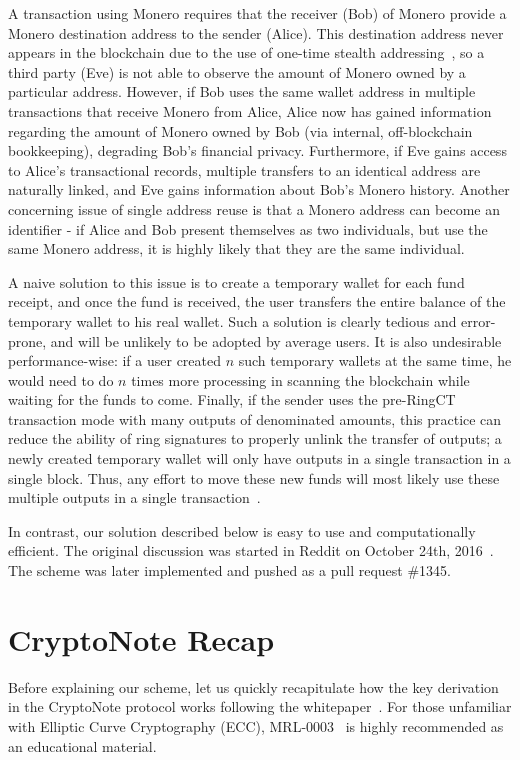 \documentclass[12pt,english]{mrl}
\theoremstyle{definition}
\numberwithin{equation}{section}
\numberwithin{figure}{section}
\numberwithin{equation}{section}
\numberwithin{equation}{section}
\numberwithin{figure}{section}
\begin{document}
A transaction using Monero requires that the receiver (Bob) of Monero provide a Monero destination address to the sender (Alice). This destination address never appears in the blockchain due to the use of one-time stealth addressing~\cite{CN}, so a third party (Eve) is not able to observe the amount of Monero owned by a particular address. However, if Bob uses the same wallet address in multiple transactions that receive Monero from Alice, Alice now has gained information regarding the amount of Monero owned by Bob (via internal, off-blockchain bookkeeping), degrading Bob's financial privacy. Furthermore, if Eve gains access to Alice's transactional records, multiple transfers to an identical address are naturally linked, and Eve gains information about Bob's Monero history. Another concerning issue of single address reuse is that a Monero address can become an identifier - if Alice and Bob present themselves as two individuals, but use the same Monero address, it is highly likely that they are the same individual. 

A naive solution to this issue is to create a temporary wallet for each fund receipt, and once the fund is received, the user transfers the entire balance of the temporary wallet to his real wallet. Such a solution is clearly tedious and error-prone, and will be unlikely to be adopted by average users. It is also undesirable performance-wise: if a user created $n$ such temporary wallets at the same time, he would need to do $n$ times more processing in scanning the blockchain while waiting for the funds to come. Finally, if the sender uses the pre-RingCT transaction mode with many outputs of denominated amounts, this practice can reduce the ability of ring signatures to properly unlink the transfer of outputs; a newly created temporary wallet will only have outputs in a single transaction in a single block. Thus, any effort to move these new funds will most likely use these multiple outputs in a single transaction~\cite{mrl4}. 

In contrast, our solution described below is easy to use and computationally efficient. The original discussion was started in Reddit on October 24th, 2016~\cite{reddit}. The scheme was later implemented and pushed as a pull request \#1345.


\section{CryptoNote Recap}\label{cryptoNote}

Before explaining our scheme, let us quickly recapitulate how the key derivation in the CryptoNote protocol works following the whitepaper~\cite{CN}. For those unfamiliar with Elliptic Curve Cryptography (ECC), MRL-0003~\cite{mrl3} is highly recommended as an educational material.
\end{document}
